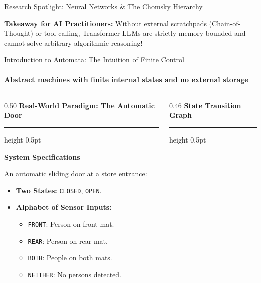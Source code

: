 \documentclass[aspectratio=169, 10pt]{beamer}
\newcommand{\colheader}[1]{%
  {\noindent\footnotesize\bfseries\color{gimpanavy}#1}%
  \vspace{0.02cm}%
  {\color{gimpanavy!30}\hrule height 0.5pt}%
  \vspace{0.05cm}%
}
\newcommand{\cardtitle}[1]{{\noindent\footnotesize\bfseries\color{gimpanavy}#1}\par\vspace{0.03cm}}
\begin{document}
\begin{frame}{Research Spotlight: Neural Networks \& The Chomsky Hierarchy}
  \vspace{0.08cm}
  \begin{tcolorbox}[conceptcard]
    {\scriptsize\textbf{Takeaway for AI Practitioners:} Without external scratchpads (Chain-of-Thought) or tool calling, Transformer LLMs are strictly memory-bounded and cannot solve arbitrary algorithmic reasoning!}
  \end{tcolorbox}
\end{frame}

\begin{frame}{Introduction to Automata: The Intuition of Finite Control}
  \framesubtitle{Abstract machines with finite internal states and no external storage}
  
  \begin{columns}[T]
    \begin{column}{0.50\textwidth}
      \colheader{Real-World Paradigm: The Automatic Door}
      \begin{tcolorbox}[conceptcard]
        \cardtitle{System Specifications}
        {\scriptsize
        An automatic sliding door at a store entrance:
        \begin{itemize}\setlength{\itemsep}{1.5pt}\scriptsize
          \item \textbf{Two States:} \texttt{CLOSED}, \texttt{OPEN}.
          \item \textbf{Alphabet of Sensor Inputs:}
          \begin{itemize}\setlength{\itemsep}{1pt}\scriptsize
            \item \texttt{FRONT}: Person on front mat.
            \item \texttt{REAR}: Person on rear mat.
            \item \texttt{BOTH}: People on both mats.
            \item \texttt{NEITHER}: No persons detected.
          \end{itemize}
        \end{itemize}
        }
      \end{tcolorbox}
    \end{column}
    
    \begin{column}{0.46\textwidth}
      \colheader{State Transition Graph}
      \begin{center}
\end{center}
\end{column}
\end{columns}
\end{frame}
\end{document}
